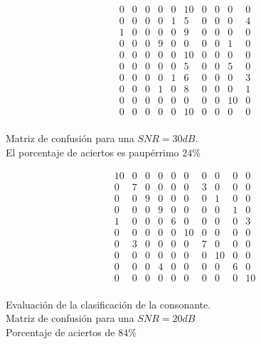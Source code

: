 \documentclass[conference,a4paper,10pt,oneside,final]{tfmpd}
\begin{document}
	\begin{table}
	\[
		\begin{array}{cccccccccc}
0 & 0 & 0 & 0 & 0 & 10 & 0 & 0 & 0 & 0 \\
0 & 0 & 0 & 0 & 1 & 5 & 0 & 0 & 0 & 4 \\
1 & 0 & 0 & 0 & 0 & 9 & 0 & 0 & 0 & 0 \\
0 & 0 & 0 & 9 & 0 & 0 & 0 & 0 & 1 & 0 \\
0 & 0 & 0 & 0 & 0 & 10 & 0 & 0 & 0 & 0 \\
0 & 0 & 0 & 0 & 0 & 5 & 0 & 0 & 5 & 0 \\
0 & 0 & 0 & 0 & 1 & 6 & 0 & 0 & 0 & 3 \\
0 & 0 & 0 & 1 & 0 & 8 & 0 & 0 & 0 & 1 \\
0 & 0 & 0 & 0 & 0 & 0 & 0 & 0 & 10 & 0 \\
0 & 0 & 0 & 0 & 0 & 10 & 0 & 0 & 0 & 0 \\
		\end{array}
	\]
		\caption{Matriz de confusión para una $SNR=30dB$. \\
		El porcentaje de aciertos es paupérrimo $24\%$}
		\label{treinta}
	\end{table}

	\begin{table}
	\[
		\begin{array}{cccccccccc}
10 & 0 & 0 & 0 & 0 & 0 & 0 & 0 & 0 & 0 \\
0 & 7 & 0 & 0 & 0 & 0 & 3 & 0 & 0 & 0 \\
0 & 0 & 9 & 0 & 0 & 0 & 0 & 1 & 0 & 0 \\
0 & 0 & 0 & 9 & 0 & 0 & 0 & 0 & 1 & 0 \\
1 & 0 & 0 & 0 & 6 & 0 & 0 & 0 & 0 & 3 \\
0 & 0 & 0 & 0 & 0 & 10 & 0 & 0 & 0 & 0 \\
0 & 3 & 0 & 0 & 0 & 0 & 7 & 0 & 0 & 0 \\
0 & 0 & 0 & 0 & 0 & 0 & 0 & 10 & 0 & 0 \\
0 & 0 & 0 & 4 & 0 & 0 & 0 & 0 & 6 & 0 \\
0 & 0 & 0 & 0 & 0 & 0 & 0 & 0 & 0 & 10 \\
		\end{array}
	\]
		\caption{Evaluación de la clasificación de la consonante. \\
		Matriz de confusión para una $SNR=20dB$ \\
		Porcentaje de aciertos de $84\%$}
		\label{consonante}
	\end{table}
	
\end{document}
